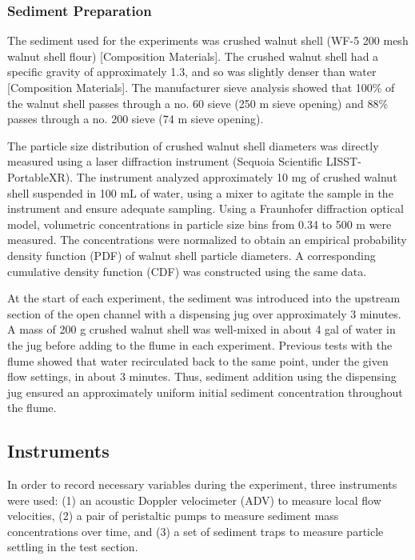 \documentclass[12pt]{article}
\begin{document}
\subsubsection{Sediment Preparation}

The sediment used for the experiments was crushed walnut shell (WF-5 200 mesh walnut shell flour) [Composition Materials]. The crushed walnut shell had a specific gravity of approximately 1.3, and so was slightly denser than water [Composition Materials]. The manufacturer sieve analysis showed that 100\% of the walnut shell passes through a no. 60 sieve (250 \textmu m sieve opening) and 88\% passes through a no. 200 sieve (74 \textmu m sieve opening).

The particle size distribution of crushed walnut shell diameters was directly measured using a laser diffraction instrument (Sequoia Scientific LISST-Portable\textbar XR). The instrument analyzed approximately 10 mg of crushed walnut shell suspended in 100 mL of water, using a mixer to agitate the sample in the instrument and ensure adequate sampling. Using a Fraunhofer diffraction optical model, volumetric concentrations in particle size bins from 0.34 to 500 \textmu m were measured. The concentrations were normalized to obtain an empirical probability density function (PDF) of walnut shell particle diameters. A corresponding cumulative density function (CDF) was constructed using the same data.

At the start of each experiment, the sediment was introduced into the upstream section of the open channel with a dispensing jug over approximately 3 minutes. A mass of 200 g crushed walnut shell was well-mixed in about 4 gal of water in the jug before adding to the flume in each experiment. Previous tests with the flume showed that water recirculated back to the same point, under the given flow settings, in about 3 minutes. Thus, sediment addition using the dispensing jug ensured an approximately uniform initial sediment concentration throughout the flume.

\subsection{Instruments}

In order to record necessary variables during the experiment, three instruments were used: (1) an acoustic Doppler velocimeter (ADV) to measure local flow velocities, (2) a pair of peristaltic pumps to measure sediment mass concentrations over time, and (3) a set of sediment traps to measure particle settling in the test section.
\end{document}
